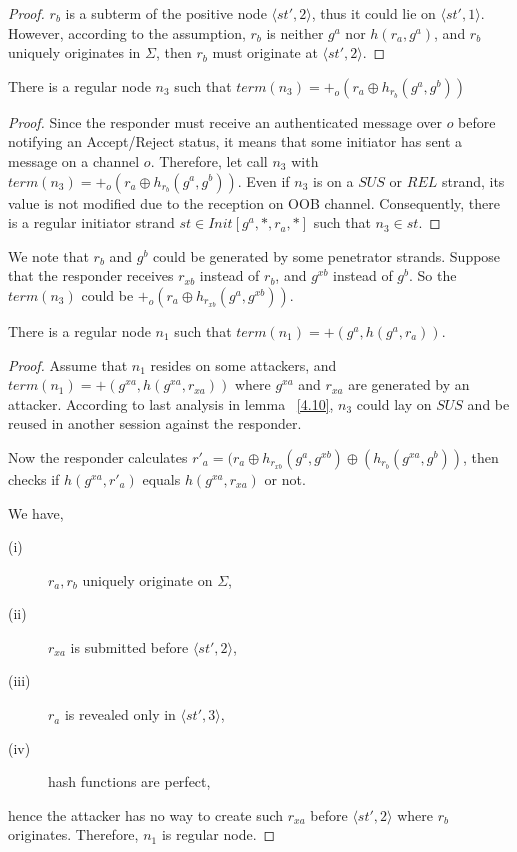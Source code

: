 \begin{proof}
$r_b$ is a subterm of the positive node $\langle st',2 \rangle$, thus it could lie on $\langle st',1 \rangle$. However, according to the assumption, $r_b$ is neither $g^a$ nor $h(r_a,g^a)$, and $r_b$ uniquely originates in $\Sigma$, then $r_b$ must originate at $\langle st',2 \rangle$.
\end{proof}
 
\begin{Lemma}\label{4.10}
There is a regular node $n_3$ such that $term(n_3)= +_o(r_a \oplus h_{r_b}(g^a,g^b))$ 
\end{Lemma}

\begin{proof}
Since the responder must receive an authenticated message over $o$ before notifying an Accept/Reject status, it means that some initiator has sent a message on a channel $o$. Therefore, let call $n_3$ with $term(n_3)= +_o(r_a \oplus h_{r_b}(g^a,g^b))$. Even if $n_3$ is on a $SUS$ or $REL$ strand, its value is not modified due to the reception on OOB channel. Consequently, there is a regular initiator strand $st \in Init[g^a,*, r_a,*]$ such that $n_3 \in st$. 
\end{proof}

We note that $r_b$ and $g^b$ could be generated by some penetrator strands. Suppose that the responder receives $r_{xb}$ instead of $r_b$, and $g^{xb}$ instead of $g^b$. So the $term(n_3)$ could be $+_o(r_a \oplus h_{r_{xb}}(g^a,g^{xb}))$.

\begin{Lemma}\label{4.11}
There is a regular node $n_1$ such that $term(n_1)= +(g^a,h(g^a,r_a))$.
\end{Lemma}

\begin{proof}
Assume that $n_1$ resides on some attackers, and $term(n_1) = +(g^{xa},h(g^{xa},r_{xa}))$ where $g^{xa}$ and $r_{xa}$ are generated by an attacker. According to last analysis in lemma ~\ref{4.10}, $n_3$ could lay on $SUS$ and be reused in another session against the responder. 

Now the responder calculates $r'_{a} = (r_a \oplus h_{r_{xb}}(g^a,g^{xb}) \oplus (h_{r_b}(g^{xa},g^b))$, then checks if $h(g^{xa},r'_{a})$ equals $h(g^{xa},r_{xa})$ or not. 

We have,
\begin{description} 
 \item [(i)] $r_a, r_b$ uniquely originate on $\Sigma$, 
 \item [(ii)] $r_{xa}$ is submitted before $\langle st',2\rangle$, 
 \item [(iii)] $r_{a}$ is revealed only in $\langle st',3 \rangle$, 
 \item [(iv)] hash functions are perfect, 
\end{description}
hence the attacker has no way to create such $r_{xa}$ before $\langle st',2 \rangle$ where $r_b$ originates. Therefore, $n_1$ is regular node. 
 \end{proof}

